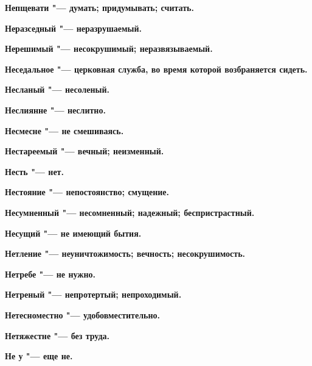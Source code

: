 \begin{multicols}{2}
\bfseries Непщевати\normalfont{} "--- думать; придумывать; считать. 




\bfseries Неразседный\normalfont{} "--- неразрушаемый. 




\bfseries Нерешимый\normalfont{} "--- несокрушимый; неразвязываемый. 




\bfseries Неседальное\normalfont{} "--- церковная служба, во время которой возбраняется сидеть. 




\bfseries Несланый\normalfont{} "--- несоленый. 




\bfseries Неслиянне\normalfont{} "--- неслитно. 




\bfseries Несмесне\normalfont{} "--- не смешиваясь. 




\bfseries Нестареемый\normalfont{} "--- вечный; неизменный. 




\bfseries Несть\normalfont{} "--- нет. 




\bfseries Нестояние\normalfont{} "--- непостоянство; смущение. 




\bfseries Несумненный\normalfont{} "--- несомненный; надежный; беспристрастный. 




\bfseries Несущий\normalfont{} "--- не имеющий бытия. 




\bfseries Нетление\normalfont{} "--- неуничтожимость; вечность; несокрушимость. 




\bfseries Нетребе\normalfont{} "--- не нужно. 




\bfseries Нетреный\normalfont{} "--- непротертый; непроходимый. 




\bfseries Нетесноместно\normalfont{} "--- удобовместительно. 




\bfseries Нетяжестне\normalfont{} "--- без труда. 




\bfseries Не у\normalfont{} "--- еще не. 





\end{multicols}
